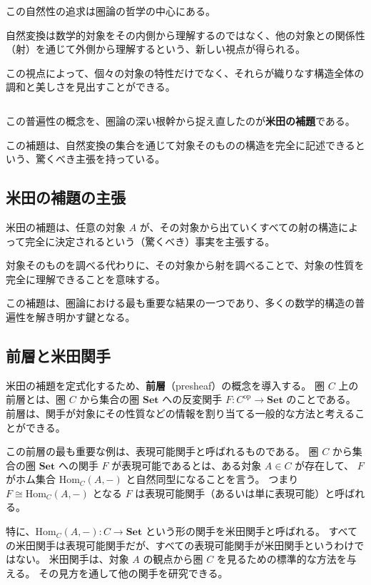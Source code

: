 \documentclass[uplatex,a4j,12pt,dvipdfmx]{jsarticle}
\begin{document}
${}$

この自然性の追求は圏論の哲学の中心にある。

自然変換は数学的対象をその内側から理解するのではなく、他の対象との関係性（射）を通じて外側から理解するという、新しい視点が得られる。

この視点によって、個々の対象の特性だけでなく、それらが織りなす構造全体の調和と美しさを見出すことができる。

${}$

この普遍性の概念を、圏論の深い根幹から捉え直したのが\textbf{米田の補題}である。

この補題は、自然変換の集合を通じて対象そのものの構造を完全に記述できるという、驚くべき主張を持っている。

\subsection{米田の補題の主張}

米田の補題は、任意の対象 $A$ が、その対象から出ていくすべての射の構造によって完全に決定されるという（驚くべき）事実を主張する。

対象そのものを調べる代わりに、その対象から射を調べることで、対象の性質を完全に理解できることを意味する。

この補題は、圏論における最も重要な結果の一つであり、多くの数学的構造の普遍性を解き明かす鍵となる。


\subsection{前層と米田関手}
米田の補題を定式化するため、\textbf{前層}（presheaf）の概念を導入する。
圏 $C$ 上の前層とは、圏 $C$ から集合の圏 $\mathbf{Set}$ への反変関手 $F: C^{\text{op}} \to \mathbf{Set}$ のことである。
前層は、関手が対象にその性質などの情報を割り当てる一般的な方法と考えることができる。

この前層の最も重要な例は、表現可能関手と呼ばれるものである。
圏 $C$ から集合の圏 $\textbf{Set}$ への関手 $F$ が表現可能であるとは、ある対象 $A \in C$ が存在して、
$F$ がホム集合 $\text{Hom}_C(A,-)$ と自然同型になることを言う。
つまり $F \cong \text{Hom}_C(A,-)$ となる $F$ は表現可能関手（あるいは単に表現可能）と呼ばれる。

特に、$\mathrm{Hom}_C(A, -): C \to \mathbf{Set}$ という形の関手を米田関手と呼ばれる。
すべての米田関手は表現可能関手だが、すべての表現可能関手が米田関手というわけではない。
米田関手は、対象 $A$ の観点から圏 $C$ を見るための標準的な方法を与える。
その見方を通して他の関手を研究できる。
\end{document}
